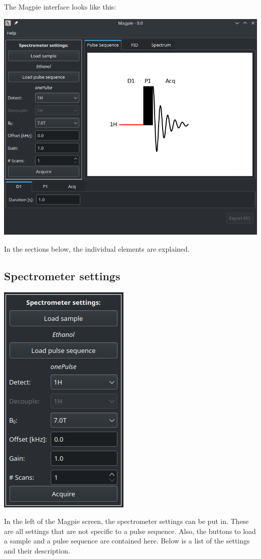 \documentclass[11pt,a4paper]{article}
\begin{document}
The Magpie interface looks like this:
\begin{center}
\includegraphics[width=0.7\linewidth]{images/Full_interface.png}
\end{center}
In the sections below, the individual elements are explained.

\subsection{Spectrometer settings}


\begin{center}
\includegraphics[width=0.3\linewidth]{images/Spec_settings.png}
\end{center}
In the left of the Magpie screen, the spectrometer settings can be put in. These are all settings that are not specific to a pulse sequence. Also, the buttons to load a sample and a pulse sequence are contained here. Below is a list of the settings and their description.
\end{document}
